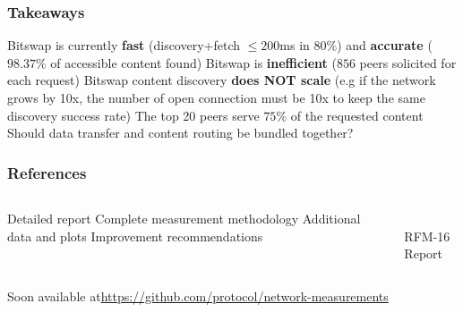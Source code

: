 \documentclass{pl-slide}
\begin{document}
\begin{frame}
\frametitle{Takeaways}
\begin{itemize}
	\itemc Bitswap is currently \textbf{fast} (discovery+fetch $\leq 200$ms in $80\%$) and \textbf{accurate} ($98.37\%$ of accessible content found)
	\itemc Bitswap is \textbf{inefficient} ($856$ peers solicited for each request)
	\itemc Bitswap content discovery \textbf{does NOT scale} (e.g if the network grows by 10x, the number of open connection must be 10x to keep the same discovery success rate)
	\itemc The top 20 peers serve $75\%$ of the requested content
	\bigskip
	\itemc Should data transfer and content routing be bundled together?
\end{itemize}
\end{frame}

\begin{frame}
\frametitle{References}
\begin{columns}[onlytextwidth]
\begin{column}{0.60\textwidth}
\begin{itemize}
	\itemc Detailed report
	\itemc Complete measurement methodology
	\itemc Additional data and plots
	\itemc Improvement recommendations
\end{itemize}
\end{column}
\begin{column}{0.38\textwidth}
\begin{center}
\\
\medskip
RFM-16 Report
\bigskip
\end{center}
\end{column}
\end{columns}

\begin{itemize}
	\itemc Soon available at\hspace{.6em}\url{https://github.com/protocol/network-measurements}

\end{itemize}

\end{frame}
\end{document}
